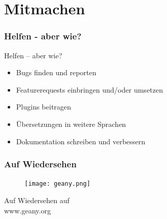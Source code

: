 \documentclass[compress]{beamer}
\begin{document}
\section{Mitmachen}
\begin{frame}
	\frametitle{Helfen - aber wie?}
	\begin{block}{Helfen -- aber wie?}
		\begin{itemize}
			\item Bugs finden und reporten
			\item Featurerequests einbringen und/oder umsetzen
			\item Plugins beitragen
			\item Übersetzungen in weitere Sprachen
			\item Dokumentation schreiben und verbessern
		\end{itemize}
	\end{block}
\end{frame}

\begin{frame}[plain]
	\frametitle{Auf Wiedersehen}
	\begin{figure}[ht]
		\texttt{[image: geany.png]}
	\end{figure}

	\begin{center}
	\huge Auf Wiedersehen auf \\ www.geany.org
	\end{center}
\end{frame}
\end{document}
